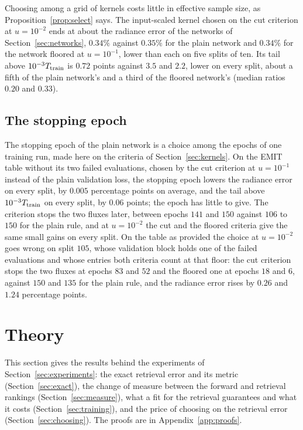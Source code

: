 \documentclass[11pt]{article}
\theoremstyle{remark}
\newcommand{\1}{\mathbf{1}}
\begin{document}
Choosing among a grid of kernels costs little in effective sample size, as Proposition~\ref{prop:select} says. The
input-scaled kernel chosen on the cut criterion at $u=10^{-2}$ ends at about the radiance error of the networks of
Section~\ref{sec:networks}, $0.34\%$ against $0.35\%$ for the plain network and $0.34\%$ for the network floored at
$u=10^{-1}$, lower than each on five splits of ten. Its tail above $10^{-3}T_{\rm train}$ is $0.72$ points against
$3.5$ and $2.2$, lower on every split, about a fifth of the plain network's and a third of the floored network's
(median ratios $0.20$ and $0.33$).

\subsection{The stopping epoch}\label{sec:epochs}

The stopping epoch of the plain network is a choice among the epochs of one training run, made here on the criteria
of Section~\ref{sec:kernels}. On the EMIT table without its two failed evaluations, chosen by the cut criterion at
$u=10^{-1}$ instead of the plain validation loss, the stopping epoch lowers the radiance error on every split, by
$0.005$ percentage points on average, and the tail above $10^{-3}T_{\rm train}$ on every split, by $0.06$ points; the
epoch has little to give. The criterion stops the two fluxes later, between epochs $141$ and $150$ against $106$ to
$150$ for the plain rule, and at $u=10^{-2}$ the cut and the floored criteria give the same small gains on every split.
On the table as provided the choice at $u=10^{-2}$ goes wrong on split $105$, whose validation block holds one of the
failed evaluations and whose entries both criteria count at that floor: the cut criterion stops the two fluxes at
epochs $83$ and $52$ and the floored one at epochs $18$ and $6$, against $150$ and $135$ for the plain rule, and the
radiance error rises by $0.26$ and $1.24$ percentage points.

\section{Theory}\label{sec:theory}

This section gives the results behind the experiments of Section~\ref{sec:experiments}: the exact retrieval error and
its metric (Section~\ref{sec:exact}), the change of measure between the forward and retrieval rankings
(Section~\ref{sec:measure}), what a fit for the retrieval guarantees and what it costs (Section~\ref{sec:training}), and
the price of choosing on the retrieval error (Section~\ref{sec:choosing}). The proofs are in Appendix~\ref{app:proofs}.
\end{document}
